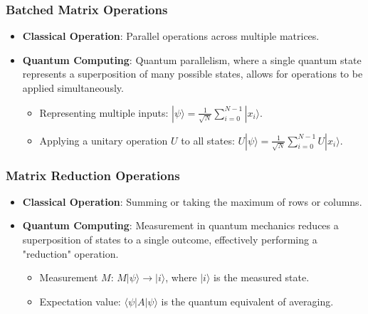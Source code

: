 \documentclass{article}
\begin{document}
\subsubsection{Batched Matrix Operations}
\begin{itemize}
    \item \textbf{Classical Operation}: Parallel operations across multiple matrices.
    \item \textbf{Quantum Computing}: Quantum parallelism, where a single quantum state represents a superposition of many possible states, allows for operations to be applied simultaneously. 
    \begin{itemize}    
        \item Representing multiple inputs: \( |\psi\rangle = \frac{1}{\sqrt{N}} \sum_{i=0}^{N-1} |x_i\rangle \). 
        \item Applying a unitary operation \( U \) to all states: \( U|\psi\rangle = \frac{1}{\sqrt{N}} \sum_{i=0}^{N-1} U|x_i\rangle \).
    \end{itemize}
\end{itemize}

\subsubsection{Matrix Reduction Operations}
\begin{itemize}
    \item \textbf{Classical Operation}: Summing or taking the maximum of rows or columns.
    \item \textbf{Quantum Computing}: Measurement in quantum mechanics reduces a superposition of states to a single outcome, effectively performing a "reduction" operation. 
    \begin{itemize}
        \item Measurement \( M \): \( M|\psi\rangle \rightarrow |i\rangle \), where \( |i\rangle \) is the measured state.
        \item Expectation value: \( \langle \psi|A|\psi \rangle \) is the quantum equivalent of averaging.
    \end{itemize}
\end{itemize}
\end{document}
